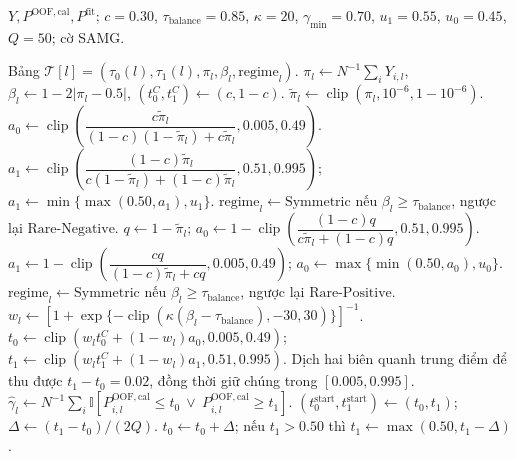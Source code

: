 \documentclass[11pt,a4paper]{article}
\newcounter{alg}
\begin{document}
\begin{algorithm}[H]
\caption{Thiết lập ngưỡng ba chế độ, bảo vệ độ phủ và điều chỉnh SAMG}
\label{alg:adaptive-thresholds}
\scriptsize
\begin{algorithmic}[1]
\renewcommand{\algorithmicrequire}{\textbf{Đầu vào:}}
\renewcommand{\algorithmicensure}{\textbf{Đầu ra:}}
\REQUIRE \parbox[t]{0.82\linewidth}{\(Y,P^{\mathrm{OOF,cal}},P^{\mathrm{fit}}\); \(c=0.30\), \(\tau_{\mathrm{balance}}=0.85\), \(\kappa=20\), \(\gamma_{\min}=0.70\), \(u_1=0.55\), \(u_0=0.45\), \(Q=50\); cờ SAMG.}
\ENSURE Bảng \(\mathcal T[l]=(\tau_0(l),\tau_1(l),\pi_l,\beta_l,\mathrm{regime}_l)\).
  \STATE \(\pi_l\gets N^{-1}\sum_iY_{i,l}\), \(\beta_l\gets1-2|\pi_l-0.5|\), \((t_0^{C},t_1^{C})\gets(c,1-c)\).
  \STATE \(\widetilde\pi_l\gets\operatorname{clip}(\pi_l,10^{-6},1-10^{-6})\).
    \STATE \(a_0\gets\operatorname{clip}\!\left(\dfrac{c\widetilde\pi_l}{(1-c)(1-\widetilde\pi_l)+c\widetilde\pi_l},0.005,0.49\right)\).
    \STATE \(a_1\gets\operatorname{clip}\!\left(\dfrac{(1-c)\widetilde\pi_l}{c(1-\widetilde\pi_l)+(1-c)\widetilde\pi_l},0.51,0.995\right)\); \(a_1\gets\min\{\max(0.50,a_1),u_1\}\).
    \STATE \(\mathrm{regime}_l\gets\mathrm{Symmetric}\) nếu \(\beta_l\ge\tau_{\mathrm{balance}}\), ngược lại \(\mathrm{Rare\text{-}Negative}\).
  \ELSE
    \STATE \(q\gets1-\widetilde\pi_l\); \(a_0\gets1-\operatorname{clip}\!\left(\dfrac{(1-c)q}{c\widetilde\pi_l+(1-c)q},0.51,0.995\right)\).
    \STATE \(a_1\gets1-\operatorname{clip}\!\left(\dfrac{cq}{(1-c)\widetilde\pi_l+cq},0.005,0.49\right)\); \(a_0\gets\max\{\min(0.50,a_0),u_0\}\).
    \STATE \(\mathrm{regime}_l\gets\mathrm{Symmetric}\) nếu \(\beta_l\ge\tau_{\mathrm{balance}}\), ngược lại \(\mathrm{Rare\text{-}Positive}\).
  \ENDIF
  \STATE \(w_l\gets[1+\exp\{-\operatorname{clip}(\kappa(\beta_l-\tau_{\mathrm{balance}}),-30,30)\}]^{-1}\).
  \STATE \(t_0\gets\operatorname{clip}(w_lt_0^C+(1-w_l)a_0,0.005,0.49)\); \(t_1\gets\operatorname{clip}(w_lt_1^C+(1-w_l)a_1,0.51,0.995)\).
    \STATE Dịch hai biên quanh trung điểm để thu được \(t_1-t_0=0.02\), đồng thời giữ chúng trong \([0.005,0.995]\).
  \ENDIF
  \STATE \(\widehat\gamma_l\gets N^{-1}\sum_i\mathbb I[P^{\mathrm{OOF,cal}}_{i,l}\le t_0\ \lor\ P^{\mathrm{OOF,cal}}_{i,l}\ge t_1]\).
    \STATE \((t_0^{\mathrm{start}},t_1^{\mathrm{start}})\gets(t_0,t_1)\); \(\Delta\gets(t_1-t_0)/(2Q)\).
        \STATE \(t_0\gets t_0+\Delta\); nếu \(t_1>0.50\) thì \(t_1\gets\max(0.50,t_1-\Delta)\).

\end{algorithmic}
\end{algorithm}
\end{document}
